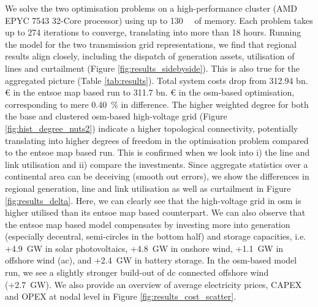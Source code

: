 \documentclass[fleqn,10pt]{wlscirep}
\begin{document}
We solve the two optimisation problems on a high-performance cluster (AMD EPYC 7543 32-Core processor) using up to \SI{130}{\giga\byte} of memory. Each problem takes up to 274 iterations to converge, translating into more than 18 hours. Running the model for the two transmission grid representations, we find that regional results align closely, including the dispatch of generation assets, utilisation of lines and curtailment (Figure \ref{fig:results_sidebyside}). This is also true for the aggregated picture (Table \ref{tab:results}). Total system costs drop from 312.94 bn. \euro{} in the \acrshort{entsoe} map based run to 311.7 bn. € in the \acrshort{osm}-based optimisation, corresponding to mere \SI{0.40}{\percent} in difference. The higher weighted degree for both the base and clustered \acrshort{osm}-based high-voltage grid (Figure \ref{fig:hist_degree_nuts2}) indicate a higher topological connectivity, potentially translating into higher degrees of freedom in the optimisation problem compared to the \acrshort{entsoe} map based run. This is confirmed when we look into i) the line and link utilisation and ii) compare the investments. Since aggregate statistics over a continental area can be deceiving (smooth out errors), we show the differences in regional generation, line and link utilisation as well as curtailment in Figure \ref{fig:results_delta}. Here, we can clearly see that the high-voltage grid in \acrshort{osm} is higher utilised than its \acrshort{entsoe} map based counterpart. We can also observe that the \acrshort{entsoe} map based model compensates by investing more into generation (especially decentral, semi-circles in the bottom half) and storage capacities, i.e. +\SI{4.9}{\giga\watt} in solar photovoltaics, +\SI{4.8}{\giga\watt} in onshore wind, +\SI{1.1}{\giga\watt} in offshore wind (\acrshort{ac}), and +\SI{2.4}{\giga\watt} in battery storage. In the \acrshort{osm}-based model run, we see a slightly stronger build-out of \acrshort{dc} connected offshore wind (+\SI{2.7}{\giga\watt}). We also provide an overview of average electricity prices, CAPEX and OPEX at nodal level in Figure \ref{fig:results_cost_scatter}.
\end{document}
